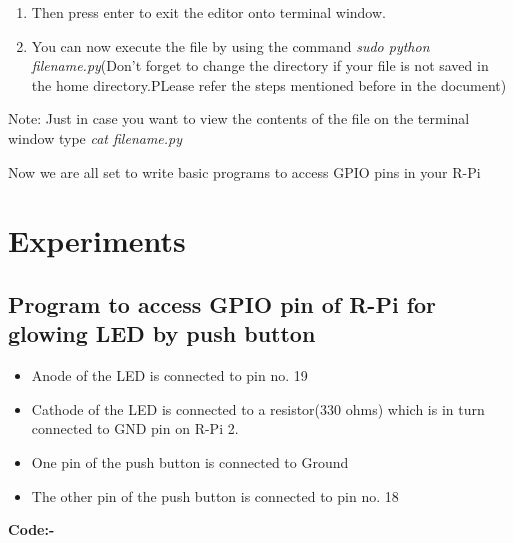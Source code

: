 \documentclass[11pt,a4paper]{report}
\begin{document}
\begin{flushleft}
\begin{enumerate}
\begin{itemize}
\begin{enumerate}
				\item Then press enter to exit the editor onto terminal window.
				\item You can now execute the file by using the command \textit{sudo python filename.py}(Don't forget to change the directory if your file is not saved in the home directory.PLease refer the steps mentioned before in the document)
			\end{enumerate}
			Note: Just in case you want to view the contents of the file on the terminal window type \textit{cat filename.py}
		\end{itemize}				
	\end{enumerate}
	\vspace{0.3cm}
	Now we are all set to write basic programs to access GPIO pins in your R-Pi
	
	\newpage
	\section{Experiments}
	\subsection{Program to access GPIO pin of R-Pi for glowing LED by push button}
	
		 \begin{itemize}
	 	\item Anode of the LED is connected to pin no. 19
	 	\item Cathode of the LED is connected to a resistor(330 ohms) which is in turn connected to GND pin on R-Pi 2.
	 	\item One pin of the push button is connected to Ground
	   	\item The other pin of the push button is connected to pin no. 18
	\end{itemize}

	\newpage
	\flushleft
	\textbf{Code:-}
	\vspace{0.3cm}
	
	\newpage

\end{flushleft}
\end{document}
